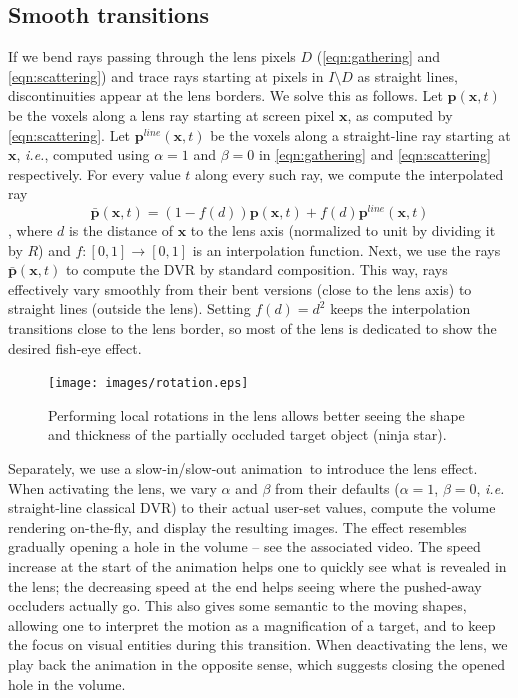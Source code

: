 \subsection{Smooth transitions}
\label{continuity} 
%
If we bend rays passing through the lens pixels $D$ (\autoref{eqn:gathering} and \autoref{eqn:scattering}) and trace rays starting at pixels in $I \setminus D$ as straight lines, discontinuities appear at the lens borders. We solve this as follows. Let $\mathbf{p}(\mathbf{x},t)$ be the voxels along a lens ray starting at screen pixel $\mathbf{x}$, as computed by  \autoref{eqn:scattering}. Let $\mathbf{p}^{line}(\mathbf{x},t)$ be the voxels along a straight-line ray starting at $\mathbf{x}$, \emph{i.e.}, computed using $\alpha=1$ and $\beta=0$ in  \autoref{eqn:gathering} and \autoref{eqn:scattering} respectively. For every value $t$ along every such ray, we compute the interpolated ray
\begin{equation}
\bar{\mathbf{p}}(\mathbf{x},t) = (1-f(d))\mathbf{p}(\mathbf{x},t) + f(d)\mathbf{p}^{line}(\mathbf{x},t)
\end{equation},
 where $d$ is the distance of $\mathbf{x}$ to the lens axis (normalized to unit by dividing it by $R$) and $f : [0,1] \rightarrow [0,1]$ is an interpolation function. Next, we use the rays $\bar{\mathbf{p}}(\mathbf{x},t)$ to compute the DVR by standard composition. This way, rays effectively vary smoothly from their bent versions (close to the lens axis) to straight lines (outside the lens). Setting $f(d) = d^2$ keeps the interpolation transitions close to the lens border, so most of the lens is dedicated to show the desired fish-eye effect.

\begin{figure}
\centering
\texttt{[image: images/rotation.eps]}

\caption{Performing local rotations in the lens allows better seeing the shape and thickness of the partially occluded target object (ninja star).}
\label{f:rotation}

\end{figure}

Separately, we use a slow-in/slow-out animation\,\cite{Dragicevic:2011:TDA:1978942.1979233} to introduce the lens effect. When activating the lens, we vary $\alpha$ and $\beta$ from their defaults ($\alpha=1$, $\beta=0$, \emph{i.e.} straight-line classical DVR) to their actual user-set values, compute the volume rendering on-the-fly, and display the resulting images. The effect resembles gradually opening a hole in the volume -- see the associated video. The speed increase at the start of the animation helps one to quickly see what is revealed in the lens; the decreasing speed at the end helps seeing where the pushed-away occluders actually go. This also gives some semantic to the moving shapes, allowing one to interpret the motion as a magnification of a target, and to keep the focus on visual entities during this transition. When deactivating the lens, we play back the animation in the opposite sense, which suggests closing the opened hole in the volume.

